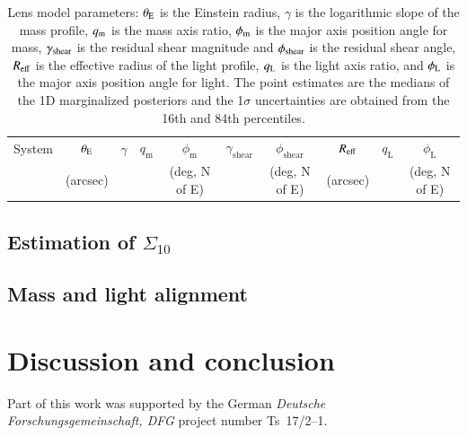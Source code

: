 \documentclass{aa}
\begin{document}
 \begin{table}
 \caption{Lens model parameters: $\theta_{\rm E}$ is the Einstein radius, $\gamma$ is the logarithmic slope of the mass profile, $q_{\rm m}$ is the mass axis ratio, $\phi_{\rm m}$ is the major axis position angle for mass,  $\gamma_{\rm shear}$ is the residual shear magnitude and $\phi_{\rm shear}$ is the residual shear angle,
 $R_{\rm eff}$ is the effective radius of the light profile,  $q_{\rm L}$ is the light axis ratio, and $\phi_{\rm L}$ is the major axis position angle for light. The point estimates are the medians of the 1D marginalized posteriors and the 1$\sigma$ uncertainties are obtained from the 16th and 84th percentiles.
 }
 \label{table:lens_params}
\begin{tabular}{lccccccccc}
\hline
     System &  $\theta_{\rm E}$ &    $\gamma$ &    $q_\text{m}$ &     $\phi_\text{m}$ &  $\gamma_\text{shear}$  &  $\phi_\text{shear}$  &
     $R_{\rm eff} $ & 
     $q_\text{L}$ & 
     $\phi_\text{L}$
     \\
     & (arcsec) & & &(deg, N of E)   & & (deg, N of E) & (arcsec) & & (deg, N of E)\\
\hline
\hline
\end{tabular}
\end{table}


\subsection{Estimation of $\Sigma_{10}$}



\subsection{Mass and light alignment}


\section{Discussion and conclusion} \label{sec:discussion}

\begin{acknowledgements}
      Part of this work was supported by the German
      \emph{Deut\-sche For\-schungs\-ge\-mein\-schaft, DFG\/} project
      number Ts~17/2--1.
\end{acknowledgements}

%
%

\end{document}

